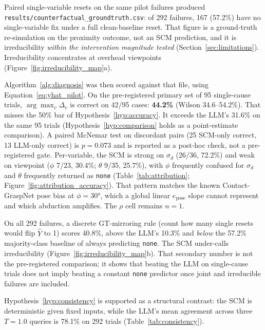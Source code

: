 \documentclass[11pt,a4paper]{report}
\begin{document}
Paired single-variable resets on the same pilot failures produced \texttt{results/counterfactual\_groundtruth.csv}: of 292 failures, 167 (57.2\%) have no single-variable fix under a full clean-baseline reset. That figure is a ground-truth re-simulation on the proximity outcome, not an SCM prediction, and it is irreducibility \emph{within the intervention magnitude tested} (Section~\ref{sec:limitations}). Irreducibility concentrates at overhead viewpoints (Figure~\ref{fig:irreducibility_map}a).

Algorithm~\ref{alg:diagnosis} was then scored against that file, using Equation~\eqref{eq:yhat_pilot}. On the pre-registered primary set of 95 single-cause trials, $\arg\max_v \Delta_v$ is correct on 42/95 cases: \textbf{44.2\%} (Wilson 34.6--54.2\%). That misses the 50\% bar of Hypothesis~\ref{hyp:accuracy}. It exceeds the LLM's 31.6\% on the same 95 trials (Hypothesis~\ref{hyp:comparison} holds as a point-estimate comparison). A paired McNemar test on discordant pairs (25 SCM-only correct, 13 LLM-only correct) is $p = 0.073$ and is reported as a post-hoc check, not a pre-registered gate. Per-variable, the SCM is strong on $\sigma_d$ (26/36, 72.2\%) and weak on viewpoint ($\phi$ 7/23, 30.4\%; $\theta$ 9/35, 25.7\%), with $\phi$ frequently confused for $\sigma_d$ and $\theta$ frequently returned as \texttt{none} (Table~\ref{tab:attribution}; Figure~\ref{fig:attribution_accuracy}). That pattern matches the known Contact-GraspNet pose bias at $\phi = 30°$, which a global linear $e_{\text{pose}}$ slope cannot represent and which abduction amplifies. The $\rho$ cell remains $n{=}1$.

On all 292 failures, a discrete GT-mirroring rule (count how many single resets would flip $\hat{Y}$ to 1) scores 40.8\%, above the LLM's 10.3\% and \emph{below} the 57.2\% majority-class baseline of always predicting \texttt{none}. The SCM under-calls irreducibility (Figure~\ref{fig:irreducibility_map}b). That secondary number is not the pre-registered comparison; it shows that beating the LLM on single-cause trials does not imply beating a constant \texttt{none} predictor once joint and irreducible failures are included.

Hypothesis~\ref{hyp:consistency} is supported as a structural contrast: the SCM is deterministic given fixed inputs, while the LLM's mean agreement across three $T{=}1.0$ queries is 78.1\% on 292 trials (Table~\ref{tab:consistency}).
\end{document}
